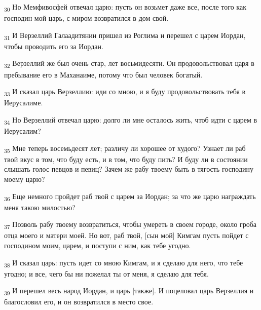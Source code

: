 \begin{tcolorbox}
\textsubscript{30} Но Мемфивосфей отвечал царю: пусть он возьмет даже все, после того как господин мой царь, с миром возвратился в дом свой.
\end{tcolorbox}
\begin{tcolorbox}
\textsubscript{31} И Верзеллий Галаадитянин пришел из Роглима и перешел с царем Иордан, чтобы проводить его за Иордан.
\end{tcolorbox}
\begin{tcolorbox}
\textsubscript{32} Верзеллий же был очень стар, лет восьмидесяти. Он продовольствовал царя в пребывание его в Маханаиме, потому что был человек богатый.
\end{tcolorbox}
\begin{tcolorbox}
\textsubscript{33} И сказал царь Верзеллию: иди со мною, и я буду продовольствовать тебя в Иерусалиме.
\end{tcolorbox}
\begin{tcolorbox}
\textsubscript{34} Но Верзеллий отвечал царю: долго ли мне осталось жить, чтоб идти с царем в Иерусалим?
\end{tcolorbox}
\begin{tcolorbox}
\textsubscript{35} Мне теперь восемьдесят лет; различу ли хорошее от худого? Узнает ли раб твой вкус в том, что буду есть, и в том, что буду пить? И буду ли в состоянии слышать голос певцов и певиц? Зачем же рабу твоему быть в тягость господину моему царю?
\end{tcolorbox}
\begin{tcolorbox}
\textsubscript{36} Еще немного пройдет раб твой с царем за Иордан; за что же царю награждать меня такою милостью?
\end{tcolorbox}
\begin{tcolorbox}
\textsubscript{37} Позволь рабу твоему возвратиться, чтобы умереть в своем городе, около гроба отца моего и матери моей. Но вот, раб твой, [сын мой] Кимгам пусть пойдет с господином моим, царем, и поступи с ним, как тебе угодно.
\end{tcolorbox}
\begin{tcolorbox}
\textsubscript{38} И сказал царь: пусть идет со мною Кимгам, и я сделаю для него, что тебе угодно; и все, чего бы ни пожелал ты от меня, я сделаю для тебя.
\end{tcolorbox}
\begin{tcolorbox}
\textsubscript{39} И перешел весь народ Иордан, и царь [также]. И поцеловал царь Верзеллия и благословил его, и он возвратился в место свое.
\end{tcolorbox}
